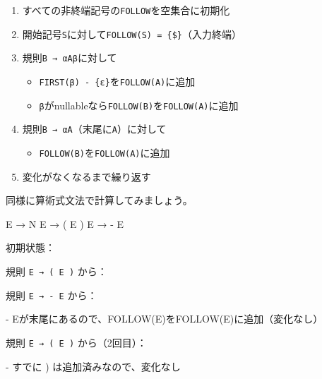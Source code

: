 \begin{enumerate}
\item
  すべての非終端記号の\texttt{FOLLOW}を空集合に初期化
\item
  開始記号\texttt{S}に対して\texttt{FOLLOW(S)\ =\ \{\$\}}（入力終端）
\item
  規則\texttt{B\ →\ αAβ}に対して

  \begin{itemize}
  \item
    \texttt{FIRST(β)\ -\ \{ε\}}を\texttt{FOLLOW(A)}に追加
  \item
    \texttt{β}がnullableなら\texttt{FOLLOW(B)}を\texttt{FOLLOW(A)}に追加
  \end{itemize}
\item
  規則\texttt{B\ →\ αA}（末尾に\texttt{A}）に対して

  \begin{itemize}
  \item
    \texttt{FOLLOW(B)}を\texttt{FOLLOW(A)}に追加
  \end{itemize}
\item
  変化がなくなるまで繰り返す
\end{enumerate}

同様に算術式文法で計算してみましょう。

\begin{codescreen}{}
E → N
E → ( E )
E → - E
\end{codescreen}

初期状態：


規則 \texttt{E\ →\ (\ E\ )} から：


規則 \texttt{E\ →\ -\ E} から：

\begin{codescreen}{}
- Eが末尾にあるので、FOLLOW(E)をFOLLOW(E)に追加（変化なし）
\end{codescreen}

規則 \texttt{E\ →\ (\ E\ )} から（2回目）：

\begin{codescreen}{}
- すでに ) は追加済みなので、変化なし
\end{codescreen}


